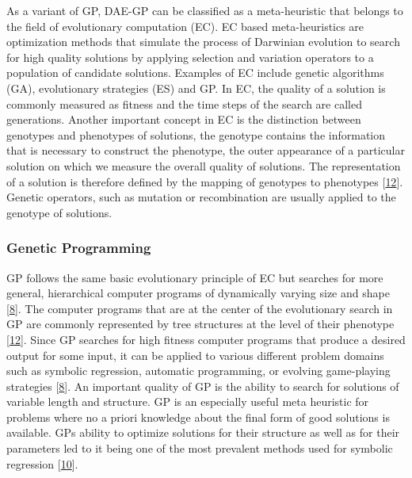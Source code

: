 \documentclass[
  11pt,
]{article}
\begin{document}
As a variant of GP, DAE-GP can be classified as a meta-heuristic that belongs to the field of evolutionary computation (EC).
EC based meta-heuristics are optimization methods that simulate the process of Darwinian evolution to search for high quality solutions by applying selection and variation operators to a population of candidate solutions.
Examples of EC include genetic algorithms (GA), evolutionary strategies (ES) and GP.
In EC, the quality of a solution is commonly measured as fitness and the time steps of the search are called generations.
Another important concept in EC is the distinction between genotypes and phenotypes of solutions, the genotype contains the information that is necessary to construct the phenotype, the outer appearance of a particular solution on which we measure the overall quality of solutions.
The representation of a solution is therefore defined by the mapping of genotypes to phenotypes {[}\protect\hyperlink{ref-design_of_modern_heuristics}{12}{]}.
Genetic operators, such as mutation or recombination are usually applied to the genotype of solutions.

\hypertarget{genetic-programming}{%
\subsubsection{Genetic Programming}\label{genetic-programming}}

GP follows the same basic evolutionary principle of EC but searches for more general, hierarchical computer programs of dynamically varying size and shape {[}\protect\hyperlink{ref-Koza1993GeneticP}{8}{]}.
The computer programs that are at the center of the evolutionary search in GP are commonly represented by tree structures at the level of their phenotype {[}\protect\hyperlink{ref-design_of_modern_heuristics}{12}{]}.
Since GP searches for high fitness computer programs that produce a desired output for some input, it can be applied to various different problem domains such as symbolic regression, automatic programming, or evolving game-playing strategies {[}\protect\hyperlink{ref-Koza1993GeneticP}{8}{]}.
An important quality of GP is the ability to search for solutions of variable length and structure.
GP is an especially useful meta heuristic for problems where no a priori knowledge about the final form of good solutions is available.
GPs ability to optimize solutions for their structure as well as for their parameters led to it being one of the most prevalent methods used for symbolic regression {[}\protect\hyperlink{ref-10.1007ux2f978-3-540-24621-3_22}{10}{]}.
\end{document}
